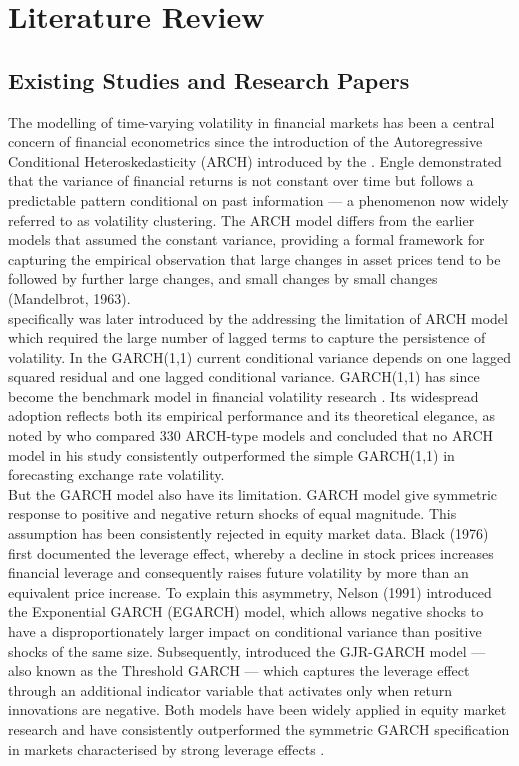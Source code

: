 \chapter{Literature Review}




\vspace{1cm}
\section{Existing Studies and Research Papers}

The modelling of time-varying volatility in financial markets has been a central concern of financial econometrics since the introduction of the Autoregressive Conditional Heteroskedasticity (ARCH) introduced by the \cite{engle1982}. Engle demonstrated that the variance of financial returns is not constant over time but follows a predictable pattern conditional on past information — a phenomenon now widely referred to as volatility clustering. The ARCH model differs from the earlier models that assumed the constant variance, providing a formal framework for capturing the empirical observation that large changes in asset prices tend to be followed by further large changes, and small changes by small changes (Mandelbrot, 1963).\\
specifically was later introduced by the \cite{bollerslev1986} addressing the limitation of ARCH model which required the large number of lagged terms to capture the persistence of volatility.  In the GARCH(1,1) current conditional variance depends on one lagged squared residual and one lagged conditional variance. GARCH(1,1) has since become the benchmark model in financial volatility research . Its widespread adoption reflects both its empirical performance and its theoretical elegance, as noted by \cite{hansen2005}  who compared 330 ARCH-type models and concluded that no ARCH model in his study consistently outperformed the simple GARCH(1,1) in forecasting exchange rate volatility.\\
But the GARCH model also have its limitation. GARCH model give symmetric response to positive and negative return shocks of equal magnitude.  This assumption has been consistently rejected in equity market data. Black (1976) first documented the leverage effect, whereby a decline in stock prices increases financial leverage and consequently raises future volatility by more than an equivalent price increase. To explain this asymmetry, Nelson (1991) introduced the Exponential GARCH (EGARCH) model, which allows negative shocks to have a disproportionately larger impact on conditional variance than positive shocks of the same size. Subsequently, \cite{glosten1993} introduced the GJR-GARCH model — also known as the Threshold GARCH — which captures the leverage effect through an additional indicator variable that activates only when return innovations are negative. Both models have been widely applied in equity market research and have consistently outperformed the symmetric GARCH specification in markets characterised by strong leverage effects \cite{ding1993}.\\

